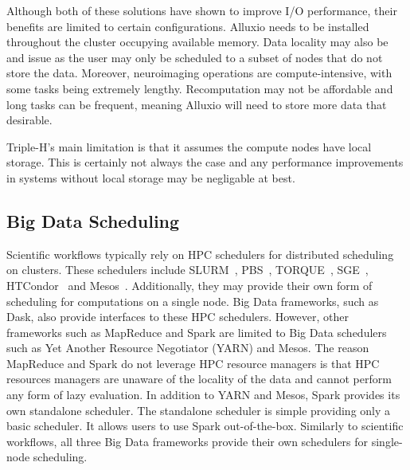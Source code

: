                 Although both of these solutions have shown to improve I/O
                performance, their benefits are limited to certain
                configurations. Alluxio needs to be installed throughout the
                cluster occupying available memory. Data locality may also be
                and issue as the user may only be scheduled to a subset of nodes
                that do not store the data. Moreover, neuroimaging operations
                are compute-intensive, with some tasks being extremely lengthy.
                Recomputation may not be affordable and long tasks can be
                frequent, meaning Alluxio will need to store more data that
                desirable.

                Triple-H's main limitation is that it assumes the compute nodes
                have local storage. This is certainly not always the case and
                any performance improvements in systems without local storage
                may be negligable at best.   
            
        \subsection{Big Data Scheduling}\label{sched}
            
            Scientific workflows typically rely on HPC schedulers for
            distributed scheduling on clusters. These schedulers include
            SLURM~\cite{yoo2003slurm}, PBS~\cite{10.1007/3-540-60153-8_34},
            TORQUE~\cite{computing2015torque}, SGE~\cite{SGE},
            HTCondor~\cite{htcondor} and Mesos~\cite{hindman2011mesos}.
            Additionally, they may provide their own form of scheduling for
            computations on a single node. Big Data frameworks, such as Dask,
            also provide interfaces to these HPC schedulers. However, other
            frameworks such as MapReduce and Spark are limited to Big Data
            schedulers such as Yet Another Resource Negotiator (YARN) and Mesos.
            The reason MapReduce and Spark do not leverage HPC resource managers
            is that HPC resources managers are unaware of the locality of the
            data and cannot perform any form of lazy evaluation. In addition to
            YARN and Mesos, Spark provides its own standalone scheduler. The
            standalone scheduler is simple providing only a basic scheduler. It
            allows users to use Spark out-of-the-box. Similarly to scientific
            workflows, all three Big Data frameworks provide their own
            schedulers for single-node scheduling.

